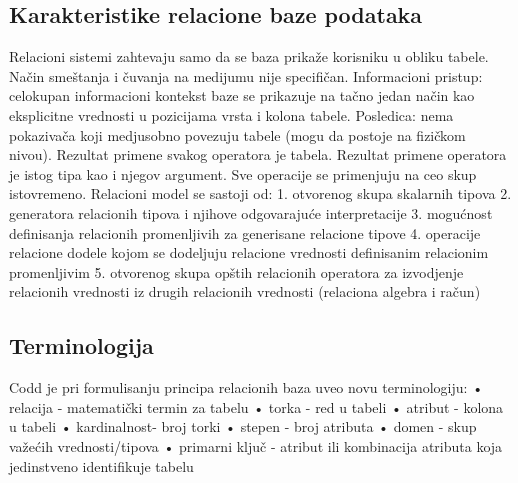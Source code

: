\documentclass{article}
\begin{document}
\subsection{Karakteristike relacione baze podataka}
Relacioni sistemi zahtevaju samo da se baza prikaže korisniku u obliku
tabele. Način smeštanja i čuvanja na medijumu nije specifičan. 
Informacioni pristup: celokupan informacioni kontekst baze se prikazuje
na tačno jedan način kao eksplicitne vrednosti u pozicijama vrsta i
kolona tabele. Posledica: nema pokazivača koji medjusobno povezuju
tabele (mogu da postoje na fizičkom nivou). Rezultat primene svakog
operatora je tabela. Rezultat primene operatora je istog tipa kao i
njegov argument. Sve operacije se primenjuju na ceo skup istovremeno.
\newline
Relacioni model se sastoji od:
\newline \hspace*{0.2cm}1. otvorenog skupa skalarnih tipova
\newline \hspace*{0.2cm}2. generatora relacionih tipova i njihove
odgovarajuće interpretacije
\newline \hspace*{0.2cm}3. mogućnost definisanja relacionih
promenljivih za generisane relacione tipove
\newline \hspace*{0.2cm}4. operacije relacione dodele kojom se
dodeljuju relacione vrednosti definisanim relacionim promenljivim
\newline \hspace*{0.2cm}5. otvorenog skupa opštih relacionih operatora
za izvodjenje relacionih vrednosti iz drugih relacionih vrednosti
(relaciona algebra i račun)

\subsection{Terminologija}
Codd je pri formulisanju principa relacionih baza uveo novu 
terminologiju:
\newline \hspace*{0.2cm}• relacija - matematički termin za tabelu
\newline \hspace*{0.2cm}• torka - red u tabeli
\newline \hspace*{0.2cm}• atribut - kolona u tabeli
\newline \hspace*{0.2cm}• kardinalnost- broj torki
\newline \hspace*{0.2cm}• stepen - broj atributa
\newline \hspace*{0.2cm}• domen - skup važećih vrednosti/tipova
\newline \hspace*{0.2cm}• primarni ključ - atribut ili kombinacija atributa koja jedinstveno
identifikuje tabelu
\end{document}
